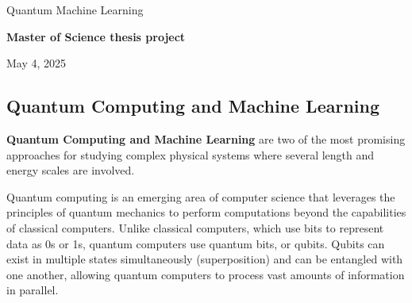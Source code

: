 \documentclass[%
oneside,                 %
final,                   %
10pt]{article}
\begin{document}

\newcommand{\exercisesection}[1]{\subsection*{#1}}






\thispagestyle{empty}

\begin{center}
{\LARGE\bf
\begin{spacing}{1.25}
Quantum Machine Learning
\end{spacing}
}
\end{center}


\begin{center}
{\bf Master of Science thesis project${}^{}$} \\ [0mm]
\end{center}

\begin{center}
\end{center}
    

\begin{center}
May 4, 2025
\end{center}

\vspace{1cm}


\subsection{Quantum Computing and Machine Learning}

\textbf{Quantum Computing and Machine Learning} are two of the most promising
approaches for studying complex physical systems where several length
and energy scales are involved.  

Quantum computing is an emerging area of computer science that
leverages the principles of quantum mechanics to perform computations
beyond the capabilities of classical computers. Unlike classical
computers, which use bits to represent data as 0s or 1s, quantum
computers use quantum bits, or qubits. Qubits can exist in multiple
states simultaneously (superposition) and can be entangled with one
another, allowing quantum computers to process vast amounts of
information in parallel.
\end{document}
